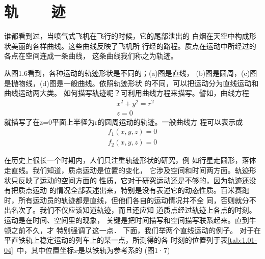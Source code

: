 \section[轨迹]{轨~~~~迹}
    谁都看到过，当喷气式飞机在飞行的时候，它的尾部泄出的
白烟在天空中构成形状美丽的各样曲线。这些曲线反映了飞机所
行经的路程。质点在运动中所经过的各点在空间连成一条曲线，
这条曲线我们称之为轨迹。

    从图1.6看到，各种运动的轨迹形状是不同的；(a)图是直线，
(b)图是圆周，(c)图是抛物线，(d)图是一般曲线。依照轨迹形状
的不同，可以把运动分为直线运动和曲线运动两大类。
    如何描写轨迹呢？可利用曲线方程来描写。譬如，曲线方程
\begin{align*}
    & x^2+y^2=r^2 \\
    & z=0
\end{align*}
就描写了在z=0平面上半径为r的圆周运动的轨迹。一般曲线方
程可以表示成
\begin{align*}
    f_1(x,y,z)=0 \\
    f_2(x,y,z)=0
\end{align*}

    在历史上很长一个时期内，人们只注重轨迹形状的研究，例
如行星走圆形，落体走直线。我们知道，质点运动是位置的变化，
它涉及空间和时间两方面。轨迹形状只反映了运动的空间方面的
性质，它对于研究运动还是不够的，因为轨迹还没有把质点运动
的情况全部表述出来，特别是没有表述它的动态性质。百米赛跑
时，所有运动员的轨迹都是直线，但他们各自的运动情况并不全
同，否则就分不出名次了。我们不仅应该知道轨迹，而且还应知
道质点经过轨迹上各点的时刻。运动是在时间、空间里的现象，
关键是把时间描写和空间描写联系起来。直到牛顿之前不久，才
特别强调了这一点．
    下面，我们举两个直线运动的例子。
    对于在平直铁轨上稳定运动的列车上的某一点，所测得的各
时刻的位置列于表\ref{tab:1.01-04}~中，其中位置坐标$x$是以铁轨为参考系的
(图1·7)
\begin{table}[!h]
    \vspace{-0.5em}
    \caption{}
    \label{tab:1.01-04}
    \centering
    \vspace{-1.2em}
\end{table}

